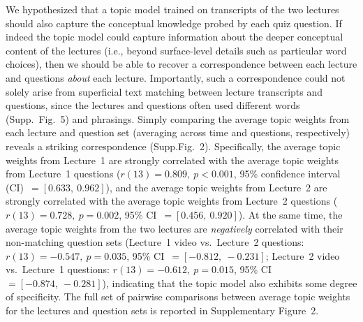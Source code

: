 \documentclass[10pt]{article}
\newcommand{\topicWeights}{2}
\newcommand{\jaccard}{5}
\providecommand{\DIFaddtex}[1]{{\protect\color{blue}\uwave{#1}}} %
\providecommand{\DIFaddbegin}{} %
\providecommand{\DIFaddend}{} %
\providecommand{\DIFadd}[1]{\texorpdfstring{\DIFaddtex{#1}}{#1}} %
\newcommand{\DIFaddincludegraphics}[2][]{{\color{blue}\fbox{\DIFOincludegraphics[#1]{#2}}}} %
\DeclareRobustCommand{\DIFaddbegin}{\DIFOaddbegin \let\includegraphics\DIFaddincludegraphics} %
\DeclareRobustCommand{\DIFaddend}{\DIFOaddend \let\includegraphics\DIFOincludegraphics} %
\begin{document}
We hypothesized that a topic model trained on transcripts of the two lectures
should also capture the conceptual knowledge probed by each quiz question. If
indeed the topic model could capture information about the deeper conceptual
content of the lectures (i.e., beyond surface-level details such as particular
word choices), then we should be able to recover a correspondence between each
lecture and questions \textit{about} each lecture. Importantly, such a
correspondence could not solely arise from superficial text matching between
lecture transcripts and questions, since the lectures and questions often used
different words (Supp.~Fig.~\jaccard) and phrasings. Simply comparing the
average topic weights from each lecture and question set (averaging across time
and questions, respectively) reveals a striking correspondence
(Supp.\DIFaddbegin \DIFadd{~}\DIFaddend Fig.~\topicWeights). Specifically, the average topic weights from Lecture~1 are
strongly correlated with the average topic weights from Lecture~1 questions
($r(13) = 0.809,~p < 0.001$, 95\% confidence interval (CI)~$= [0.633,~0.962]$),
and the average topic weights from Lecture~2 are strongly correlated with the
average topic weights from Lecture~2 questions ($r(13) = 0.728,~p = 0.002$,
95\% CI~$= [0.456,~0.920]$). At the same time, the average topic weights from
the two lectures are \textit{negatively} correlated with \DIFaddbegin \DIFadd{the average topic weights from }\DIFaddend their non-matching
question sets (Lecture~1 video vs.~Lecture~2 questions: $r(13) = -0.547,~p =
0.035$, 95\% CI~$= [-0.812, ~-0.231]$; Lecture~2 video vs.~Lecture~1 questions:
$r(13) = -0.612,~p = 0.015$, 95\% CI~$= [-0.874,~-0.281]$), indicating that the
topic model also exhibits some degree of specificity. The full set of pairwise
comparisons between average topic weights for the lectures and question sets is
reported in Supplementary Figure~\topicWeights.
\end{document}

